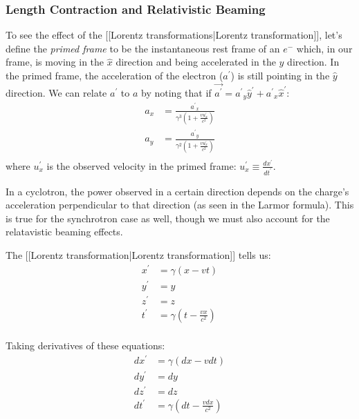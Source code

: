 \documentclass{article}
\def\ap{{a^\prime}}
\def\xp{{x^{\prime}}}
\def\yp{{y^{\prime}}}
\def\zp{{z^{\prime}}}
\def\tp{{t^{\prime}}}
\def\upx{{u_x^\prime}}
\def\^{\hat }
\begin{document}
\subsubsection{Length Contraction and Relativistic Beaming
}

To see the effect of the [[Lorentz transformations|Lorentz transformation]],
let's define the {\it primed frame} to be the instantaneous rest frame of an
$e^-$ which, in our frame, is moving in the $\^x$ direction and being 
accelerated in the $\^y$ direction.
In the primed frame, the acceleration of the electron ($\ap$) is still pointing
in the $\^y$ direction.  We can relate $\ap$ to $a$ by
noting that if $\vec\ap=\ap_y\^y^\prime+\ap_x\^x^\prime$:
$$\begin{aligned}a_x&=\frac{\ap_x}{\gamma^3(1+\frac{vu_x^\prime}{ c^2})}\\ 
a_y&=\frac{\ap_y}{\gamma^2(1+\frac{vu_x^\prime}{ c^2})}\\ \end{aligned}$$
where $\upx$ is the observed velocity in the primed frame: 
$\upx\equiv\frac{d\xp}{ d\tp}$.

In a cyclotron, the power observed in a certain direction depends on the charge's acceleration perpendicular to that direction (as seen in the Larmor formula). This is true for the synchrotron case as well, though we must also account for the relatavistic beaming effects.

The [[Lorentz transformation|Lorentz transformation]] tells us:
$$\begin{aligned}\xp&=\gamma(x-vt)\\ 
\yp&=y\\ 
\zp&=z\\ 
\tp&=\gamma(t-\frac{vx}{ c^2})\\ \end{aligned}$$

Taking derivatives of these equations:
$$\begin{aligned}d\xp&=\gamma(dx-vdt)\\ 
d\yp&=dy\\ 
d\zp&=dz\\ 
d\tp&=\gamma(dt-\frac{vdx}{ c^2})\\ \end{aligned}$$
\end{document}

